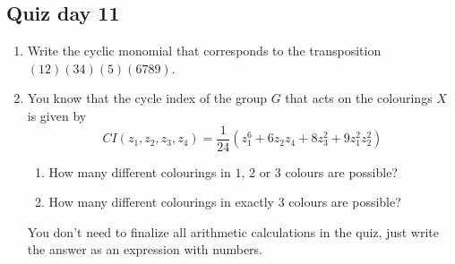 \documentclass[12pt]{article}
\begin{document}


\subsection*{Quiz day 11}

\begin{enumerate} 
    \item Write the cyclic monomial that corresponds to the transposition $(12)(34)(5)(6789)$.
    
    \item You know that the cycle index of the group $G$ that acts on the colourings $X$ is given by 
    \[
    CI(z_1, z_2, z_3, z_4) = \frac{1}{24}(z_1^6 + 6z_2z_4 + 8z_3^2 + 9z_1^2 z_2^2)
    \]
    \begin{enumerate}[label=\alph*)]
        \item How many different colourings in $1$, $2$ or $3$ colours are possible?
        \item How many different colourings in exactly $3$ colours are possible?
    \end{enumerate}

    You don't need to finalize all arithmetic calculations in the quiz, just write the answer as an expression with numbers. 
\end{enumerate}
\end{document}
